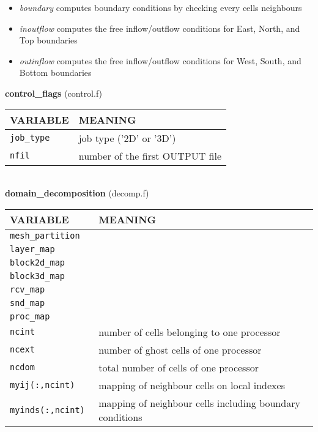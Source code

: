 \begin{itemize}
\item {\em boundary} computes boundary conditions by checking every cells neighbours 
\item {\em inoutflow} computes the free inflow/outflow conditions for East, North, and Top boundaries
\item {\em outinflow} computes the free inflow/outflow conditions for West, South, and Bottom boundaries
\end{itemize}
%
%
{\large {\bf control\_flags}} (control.f)\\[5mm]
\begin{tabular}{|p{6cm}|p{6cm}|}\hline
VARIABLE & MEANING\\\hline
\tt  job\_type    & job type ('2D' or '3D') \\\hline
\tt  nfil         & number of the first OUTPUT file \\\hline
\end{tabular}\\[5mm]
%
%
{\large{\bf domain\_decomposition}} (decomp.f)\\[5mm]
\begin{tabular}{|p{6cm}|p{6cm}|}\hline
VARIABLE & MEANING\\\hline
\tt mesh\_partition   & \\ \hline
\tt layer\_map   & \\ \hline
\tt block2d\_map & \\ \hline
\tt block3d\_map & \\ \hline
\tt rcv\_map   & \\ \hline
\tt snd\_map & \\ \hline
\tt proc\_map & \\ \hline
\tt ncint    & number of cells belonging to one processor\\ \hline
\tt ncext    & number of ghost cells of one processor\\ \hline
\tt ncdom    & total number of cells of one processor\\ \hline
\tt myij(:,ncint)   &  mapping of neighbour cells on local indexes\\ \hline
\tt myinds(:,ncint) &  mapping of neighbour cells including boundary conditions\\ \hline
\end{tabular}\\[5mm]
